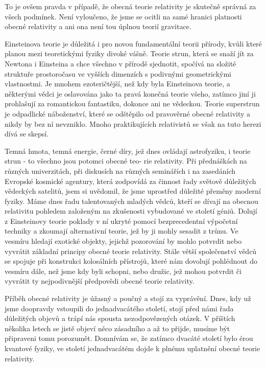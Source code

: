   To je ovšem pravda v případě, že obecná teorie relativity je skutečně správná za všech podmínek.
  Není vyloučeno, že jsme se ocitli na samé hranici platnosti obecné relativity a ani ona není tou
  úplnou teorií gravitace. 

  Einsteinova teorie je důležitá i pro novou fundamentální teorii přírody, kvůli které planou mezi
  teoretickými fyziky divoké vášně. Teorie strun, která se snaží jít za Newtona i Einsteina a chce
  všechno v přírodě sjednotit, spočívá na složité struktuře prostoročasu ve vyšších dimenzích s
  podivnými geometrickými vlastnostmi. Je mnohem ezoteričtější, než kdy byla Einsteinova teorie, a
  některými vědci je oslavována jako ta pravá konečná teorie všeho, zatímco jiní ji prohlašují za
  romantickou fantastiku, dokonce ani ne vědeckou. Teorie superstrun je odpadlické náboženství,
  které se odštěpilo od pravověrné obecné relativity a nikdy by bez ní nevzniklo. Mnoho
  praktikujících relativistů se však na tuto herezi dívá se skepsí. 

  Temná hmota, temná energie, černé díry, jež dnes ovládají astrofyziku, i teorie strun - to všechno
  jsou potomci obecné teo- rie relativity. Při přednáškách na různých univerzitách, při diskusích na
  různých seminářích i na zasedáních Evropské kosmické agentury, která zodpovídá za činnost řady
  světově důležitých vědeckých satelitů, jsem si uvědomil, že jsme uprostřed důležité přeměny
  moderní fyziky. Máme dnes řadu talentovaných mladých vědců, kteří se dívají na obecnou relativitu
  pohledem založeným na zkušenosti vybudované ve století géniů. Dolují z Einsteinovy teorie poklady
  v ní ukryté pomocí bezprecedentní výpočetní techniky a zkoumají alternativní teorie, jež by ji
  mohly sesadit z trůnu. Ve vesmíru hledají exotické objekty, jejichž pozorování by mohlo potvrdit
  nebo vyvrátit základní principy obecné teorie relativity. Stále větší společenství vědců se
  spojuje při konstrukci kolosálních přístrojů, které nám dovolují pohlédnout do vesmíru dále, než
  jsme kdy byli schopni, nebo družic, jež mohou potvrdit či vyvrátit ty nejpodivnější předpovědi
  obecné teorie relativity. 

  Příběh obecné relativity je úžasný a poučný a stojí za vyprávění. Dnes, kdy už jsme doopravdy
  vstoupili do jednadvacátého století, stojí před námi řada důležitých objevů a trápí nás spousta
  nezodpovězených otázek. V příštích několika letech se jistě objeví něco zásadního a až to přijde,
  musíme být připraveni tomu porozumět. Domnívám se, že zatímco dvacáté století bylo érou kvantové
  fyziky, ve století jednadvacátém dojde k plnému uplatnění obecné teorie relativity.

